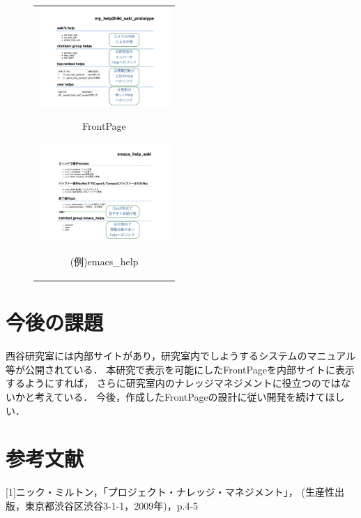 \documentclass[10pt,a4j,twocolumn]{jsarticle}
\begin{document}
\begin{figure}[htbp]
\begin{center}
\begin{tabular}{c}
\begin{minipage}{0.5\hsize}
\begin{center}
\includegraphics[width=5cm,bb=100 100 1000 1000]{my_help2hiki_saki.014.png}
\end{center}
\hspace{1cm} FrontPage

\end{minipage}
\begin{minipage}{0.5\hsize}
\begin{center}
\includegraphics[width=5cm,bb=100 100 1000 1000]{my_help2hiki_saki.015.png}
\end{center}
\hspace{1cm} (例)emacs\_help

\end{minipage}
\end{tabular}
\end{center}
\end{figure}

\section{今後の課題}
西谷研究室には内部サイトがあり，研究室内でしようするシステムのマニュアル等が公開されている．
本研究で表示を可能にしたFrontPageを内部サイトに表示するようにすれば，
さらに研究室内のナレッジマネジメントに役立つのではないかと考えている．
今後，作成したFrontPageの設計に従い開発を続けてほしい．

\section{参考文献}
[1]ニック・ミルトン，「プロジェクト・ナレッジ・マネジメント」，
(生産性出版，東京都渋谷区渋谷3-1-1，2009年)，p.4-5
\end{document}
